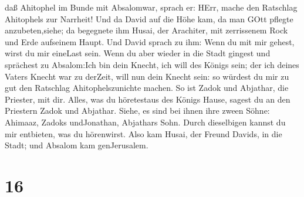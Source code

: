 daß Ahitophel im Bunde mit Absalomwar, sprach er: HErr, mache den
Ratschlag Ahitophels zur Narrheit!  Und da David auf die
Höhe kam, da man GOtt pflegte anzubeten,siehe; da begegnete ihm Husai,
der Arachiter, mit zerrissenem Rock und Erde aufseinem Haupt.
 Und David sprach zu ihm: Wenn du mit mir gehest, wirst du
mir eineLast sein.  Wenn du aber wieder in die Stadt
gingest und sprächest zu Absalom:Ich bin dein Knecht, ich will des
Königs sein; der ich deines Vaters Knecht war zu derZeit, will nun dein
Knecht sein: so würdest du mir zu gut den Ratschlag Ahitophelszunichte
machen.  So ist Zadok und Abjathar, die Priester, mit dir.
Alles, was du höretestaus des Königs Hause, sagest du an den Priestern
Zadok und Abjathar.  Siehe, es sind bei ihnen ihre zween
Söhne: Ahimaaz, Zadoks undJonathan, Abjathars Sohn. Durch dieselbigen
kannst du mir entbieten, was du hörenwirst.  Also kam
Husai, der Freund Davids, in die Stadt; und Absalom kam genJerusalem.

\hypertarget{section-15}{%
\section{16}\label{section-15}}

